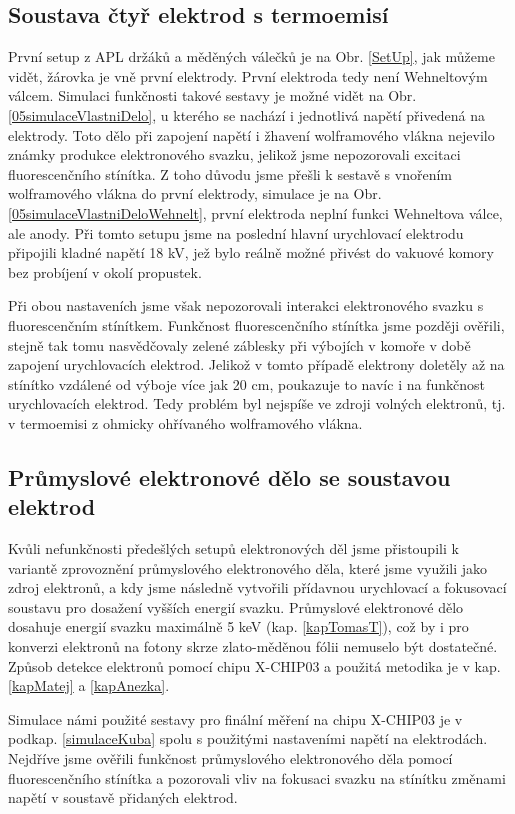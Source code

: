 \subsection{Soustava čtyř elektrod s termoemisí}
První setup z APL držáků a měděných válečků je na Obr. \ref{SetUp}, jak můžeme vidět, žárovka je vně první elektrody. První elektroda tedy není Wehneltovým válcem. Simulaci funkčnosti takové sestavy je možné vidět na Obr. \ref{05simulaceVlastniDelo}, u kterého se nachází i jednotlivá napětí přivedená na elektrody. Toto dělo při zapojení napětí i žhavení wolframového vlákna nejevilo známky produkce elektronového svazku, jelikož jsme nepozorovali excitaci fluorescenčního stínítka. Z toho důvodu jsme přešli k sestavě s vnořením wolframového vlákna do první elektrody, simulace je na Obr. \ref{05simulaceVlastniDeloWehnelt}, první elektroda neplní funkci Wehneltova válce, ale anody. Při tomto setupu jsme na poslední hlavní urychlovací elektrodu připojili kladné napětí 18 kV, jež bylo reálně možné přivést do vakuové komory bez probíjení v okolí propustek. 
\par Při obou nastaveních jsme však nepozorovali interakci elektronového svazku s fluorescenčním stínítkem. Funkčnost fluorescenčního stínítka jsme později ověřili, stejně tak tomu nasvědčovaly zelené záblesky při výbojích v komoře v době zapojení urychlovacích elektrod. Jelikož v tomto případě elektrony doletěly až na stínítko vzdálené od výboje více jak 20 cm, poukazuje to navíc i na funkčnost urychlovacích elektrod. Tedy problém byl nejspíše ve zdroji volných elektronů, tj. v termoemisi z ohmicky ohřívaného wolframového vlákna.
\subsection{Průmyslové elektronové dělo se soustavou elektrod}
Kvůli nefunkčnosti předešlých setupů elektronových děl jsme přistoupili k variantě zprovoznění průmyslového elektronového děla, které jsme využili jako zdroj elektronů, a kdy jsme následně vytvořili přídavnou urychlovací a fokusovací soustavu pro dosažení vyšších energií svazku. Průmyslové elektronové dělo dosahuje energií svazku maximálně 5 keV (kap. \ref{kapTomasT}), což by i pro konverzi elektronů na fotony skrze zlato-měděnou fólii nemuselo být dostatečné. Způsob detekce elektronů pomocí chipu X-CHIP03 a použitá metodika je v kap. \ref{kapMatej} a \ref{kapAnezka}. 
\par Simulace námi použité sestavy pro finální měření na chipu X-CHIP03 je v podkap. \ref{simulaceKuba} spolu s použitými nastaveními napětí na elektrodách. Nejdříve jsme ověřili funkčnost průmyslového elektronového děla pomocí fluorescenčního stínítka a pozorovali vliv na fokusaci svazku na stínítku změnami napětí v soustavě přidaných elektrod.
